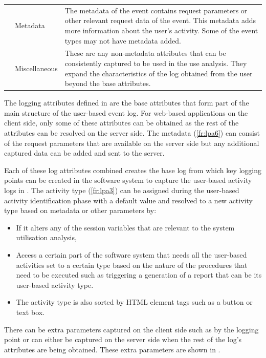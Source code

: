 \begin{table}[!htb]
\begin{tabularx}{\textwidth}{llX}
		\subsubphase{fr:lpa6} & Metadata & The metadata of the event contains request parameters or other relevant request data of the event. This metadata adds more information about the user's activity. Some of the event types may not have metadata added. \\

		\rowcolor{lightgray}
		\subsubphase{fr:lpa7} & Miscellaneous & These are any non-metadata attributes that can be consistently captured to be used in the use analysis. They expand the characteristics of the log obtained from the user beyond the base attributes. \\ 
		\bottomrule
	\end{tabularx}
\end{table}

The logging attributes defined in  are the base attributes that form part of the main structure of the user-based event log. For web-based applications on the client side, only some of these attributes can be obtained as the rest of the attributes can be resolved on the server side. The metadata (\ref{fr:lpa6}) can consist of the request parameters that are available on the server side but any additional captured data can be added and sent to the server. \par Each of these log attributes combined creates the base log from which key logging points can be created in the software system to capture the user-based activity logs in . The activity type (\ref{fr:lpa3}) can be assigned during the user-based activity identification phase with a default value and resolved to a new activity type based on metadata or other parameters by:

\begin{itemize}
	\item If it alters any of the session variables that are relevant to the system utilisation analysis,
	\item Access a certain part of the software system that needs all the user-based activities set to a certain type based on the nature of the procedures that need to be executed such as triggering a generation of a report that can be its user-based activity type.
	\item The activity type is also sorted by HTML element tags such as a button or text box.
\end{itemize}

There can be extra parameters captured on the client side such as by the logging point or can either be captured on the server side when the rest of the log's attributes are being obtained. These extra parameters are shown in .

